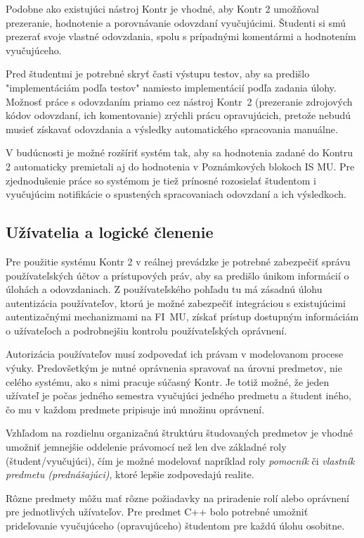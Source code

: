 \documentclass[
  digital, %
  twoside, %
  table,   %
  lof,     %
  lot,     %
]{fithesis3}
\begin{document}
Podobne ako existujúci nástroj Kontr je vhodné, aby Kontr 2 umožňoval prezeranie, hodnotenie a porovnávanie odovzdaní vyučujúcimi. Študenti si smú prezerať svoje vlastné odovzdania, spolu s prípadnými komentármi a hodnotením vyučujúceho. 

Pred študentmi je potrebné skryť časti výstupu testov, aby sa predišlo "implementáciám podľa testov" namiesto implementácií podľa zadania úlohy. Možnosť práce s odovzdaním priamo cez nástroj Kontr~2 (prezeranie zdrojových kódov odovzdaní, ich komentovanie) zrýchli prácu opravujúcich, pretože nebudú musieť získavať odovzdania a výsledky automatického spracovania manuálne. 

V budúcnosti je možné rozšíriť systém tak, aby sa hodnotenia zadané do Kontru 2 automaticky premietali aj do hodnotenia v Poznámkových blokoch IS MU. Pre zjednodušenie práce so systémom je tiež prínosné rozosielať študentom i vyučujúcim notifikácie o spustených spracovaniach odovzdaní a ich výsledkoch. 

\subsection{Užívatelia a logické členenie}

Pre použitie systému Kontr 2 v reálnej prevádzke je potrebné zabezpečiť správu používateľských účtov a prístupových práv, aby sa predišlo únikom informácií o úlohách a odovzdaniach. Z používateľského pohľadu tu má zásadnú úlohu autentizácia používateľov, ktorú je možné zabezpečiť integráciou s existujúcimi autentizačnými mechanizmami na FI~MU, získať prístup dostupným informáciám o užívateľoch a podrobnejšiu kontrolu používateľských oprávnení.

Autorizácia používateľov musí zodpovedať ich právam v modelovanom procese výuky. Predovšetkým je nutné oprávnenia spravovať na úrovni predmetov, nie celého systému, ako s nimi pracuje súčasný Kontr. Je totiž možné, že jeden užívateľ je počas jedného semestra vyučujúci jedného predmetu a študent iného, čo mu v každom predmete pripisuje inú množinu oprávnení. 

Vzhľadom na rozdielnu organizačnú štruktúru študovaných predmetov je vhodné umožniť jemnejšie oddelenie právomocí než len dve základné roly (študent/vyučujúci), čím je možné modelovať napríklad roly \emph{pomocník} či \emph{vlastník predmetu (prednášajúci)}, ktoré lepšie zodpovedajú realite.

Rôzne predmety môžu mať rôzne požiadavky na priradenie rolí alebo oprávnení pre jednotlivých užívateľov. Pre predmet C++ bolo potrebné umožniť prideľovanie vyučujúceho (opravujúceho) študentom pre každú úlohu osobitne.
\end{document}
